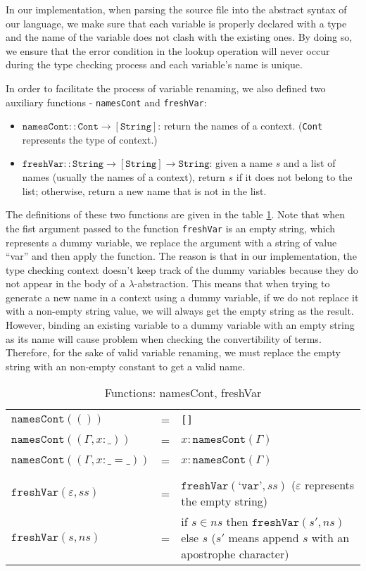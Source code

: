 In our implementation, when parsing the source file into the abstract syntax of our language, we make sure that each variable is properly declared with a type and the name of the variable does not clash with the existing ones. By doing so, we ensure that the error condition in the lookup operation will never occur during the type checking process and each variable's name is unique.

In order to facilitate the process of variable renaming, we also defined two auxiliary functions - \texttt{namesCont} and \texttt{freshVar}:
\begin{itemize}
  \item $\texttt{namesCont} :: \texttt{Cont} \to [\texttt{String}]$: return the names of a context. (\texttt{Cont} represents the type of context.)
  \item $\texttt{freshVar} :: \texttt{String} \to [\texttt{String}] \to \texttt{String}$: given a name $s$ and a list of names (usually the names of a context), return $s$ if it does not belong to the list; otherwise, return a new name that is not in the list.
\end{itemize}

The definitions of these two functions are given in the table \ref{tab:var-rename}. Note that when the fist argument passed to the function \texttt{freshVar} is an empty string, which represents a dummy variable, we replace the argument with a string of value ``var'' and then apply the function. The reason is that in our implementation, the type checking context doesn't keep track of the dummy variables because they do not appear in the body of a $\lambda$-abstraction. This means that when trying to generate a new name in a context using a dummy variable, if we do not replace it with a non-empty string value, we will always get the empty string as the result. However, binding an existing variable to a dummy variable with an empty string as its name will cause problem when checking the convertibility of terms. Therefore, for the sake of valid variable renaming, we must replace the empty string with an non-empty constant to get a valid name.  

\begin{table}[h] 
  \centering
  \begin{tabular}{l l p{6cm}}
    $\texttt{namesCont}(())$ & = & \texttt{[]} \\
    $\texttt{namesCont}((\Gamma, x : \_))$ & = & $x : \texttt{namesCont}(\Gamma)$ \\
    $\texttt{namesCont}((\Gamma, x : \_ = \_))$ & = & $x : \texttt{namesCont}(\Gamma)$ \\
    \\ 
    $\texttt{freshVar}(\varepsilon, ss)$ & = & $\texttt{freshVar}(\texttt{`var'}, ss)$ ($\varepsilon$ represents the empty string)\\
    $\texttt{freshVar}(s, ns)$ & = & if $s \in ns$ then $\texttt{freshVar}(s', ns)$ else $s$ ($s'$ means append $s$ with an apostrophe character)
  \end{tabular}
  \caption{Functions: namesCont, freshVar}
  \label{tab:var-rename}
\end{table}



